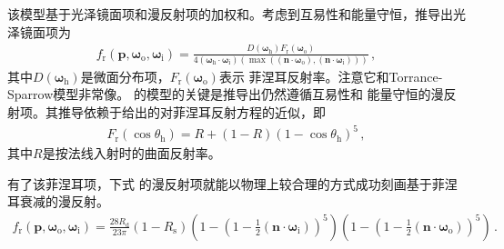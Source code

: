该模型基于光泽镜面项和漫反射项的加权和。考虑到互易性和能量守恒，推导出光泽镜面项为
\begin{align*}
    f_{\mathrm{r}}({\bm p},{\bm\omega}_{\mathrm{o}},{\bm\omega}_{\mathrm{i}})
    =\frac{D({\bm\omega}_{\mathrm{h}})F_{\mathrm{r}}({\bm\omega}_{\mathrm{o}})}
    {4({\bm\omega}_{\mathrm{h}}\cdot{\bm\omega}_{\mathrm{i}})
    (\max(({\bm n}\cdot{\bm\omega}_{\mathrm{o}}),({\bm n}\cdot{\bm\omega}_{\mathrm{i}})))}\, ,
\end{align*}
其中$D({\bm\omega}_{\mathrm{h}})$是微面分布项，$F_{\mathrm{r}}({\bm\omega}_{\mathrm{o}})$表示
菲涅耳反射率。注意它和Torrance-Sparrow模型非常像。
\citeauthor{AshikhminPhong}的模型的关键是推导出仍然遵循互易性和
能量守恒的漫反射项。其推导依赖于\citet{Schlick1993}给出的对菲涅耳反射方程的近似，即
\begin{align*}
    F_{\mathrm{r}}(\cos\theta_{\mathrm{h}})=R+(1-R)(1-\cos\theta_{\mathrm{h}})^5\, ,
\end{align*}
其中$R$是按法线入射时的曲面反射率。

有了该菲涅耳项，下式
的漫反射项就能以物理上较合理的方式成功刻画基于菲涅耳衰减的漫反射。
\begin{align*}
    f_{\mathrm{r}}({\bm p},{\bm\omega}_{\mathrm{o}},{\bm\omega}_{\mathrm{i}})
    =\frac{28R_{\mathrm{d}}}{23\pi}(1-R_{\mathrm{s}})
    \left(1-\left(1-\frac{1}{2}({\bm n}\cdot{\bm\omega}_{\mathrm{i}})\right)^5\right)
    \left(1-\left(1-\frac{1}{2}({\bm n}\cdot{\bm\omega}_{\mathrm{o}})\right)^5\right)\, .
\end{align*}

